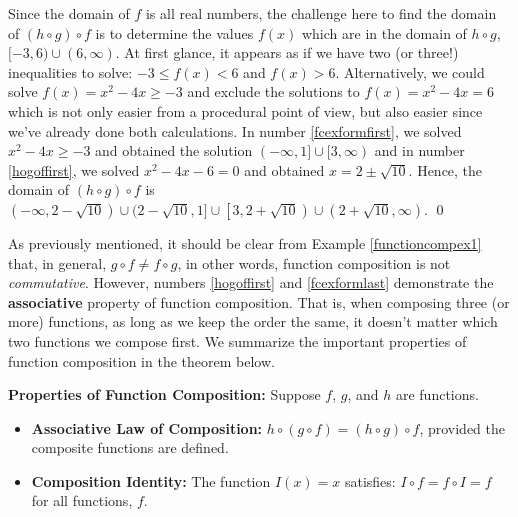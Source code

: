 \documentclass{ximera}
\begin{document}
\begin{ex}
\begin{enumerate}
\begin{itemize}
 \end{itemize}

 
Since the domain of $f$ is all real numbers, the challenge here to find the domain of $(h \circ g) \circ f$ is to determine the values $f(x)$ which are in the domain of  $h \circ g$,  $[-3, 6) \cup (6, \infty)$.  At first glance, it appears as if we have two (or three!) inequalities to solve:  $-3 \leq f(x) < 6$ and $f(x) > 6$.  Alternatively, we could solve $f(x) = x^2-4x \geq -3$ and exclude the solutions to $f(x) = x^2-4x = 6$ which is not only easier from a procedural point of view, but also easier since we've already done both calculations.   In number \ref{fcexformfirst}, we solved  $x^2-4x \geq -3$ and obtained the solution $(-\infty, 1] \cup [3, \infty)$ and in number \ref{hogoffirst}, we solved $x^2-4x-6 = 0$ and obtained $x = 2 \pm \sqrt{10}$.  Hence, the domain of $(h \circ g) \circ f$ is  $(-\infty, 2 -\sqrt{10}) \cup (2 - \sqrt{10}, 1] \cup \left[3, 2 + \sqrt{10}\right) \cup \left(2+\sqrt{10}, \infty\right)$. \qed

\end{enumerate}

\label{functioncompex1}
\end{ex}

As previously mentioned, it should be clear from  Example \ref{functioncompex1} that, in general, $g \circ f \neq f \circ g$, in other words, function composition is not \textit{commutative}.  However, numbers \ref{hogoffirst} and  \ref{fcexformlast} demonstrate the  \textbf{associative} property of function composition.  That is, when composing three (or more) functions, as long as we keep the order the same, it doesn't matter which two functions we compose first.  We summarize the important properties of function composition in the theorem below.

\medskip

\colorbox{ResultColor}{\bbm
\begin{thm}\label{functioncompprops}  \textbf{Properties of Function Composition:} Suppose $f$, $g$, and $h$ are functions.  

\begin{itemize}

\item  \textbf{Associative Law of Composition:} $h \circ (g \circ f) = (h \circ g) \circ f$, provided the composite functions are defined.

\item  \textbf{Composition Identity:}  The function $I(x) = x$ satisfies:  $ I \circ f = f \circ I =f$ for all functions, $f$.

\end{itemize}

\end{thm}
\ebm}
\end{document}

